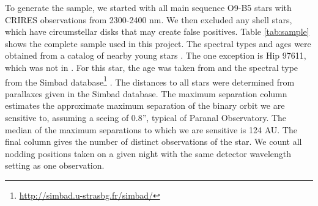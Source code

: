 \documentclass[11pt]{report}     %
\begin{document}
To generate the sample, we started with all main sequence O9-B5 stars 
with CRIRES observations from 2300-2400 nm. We then excluded any shell stars, which have circumstellar disks \citep{Porter2003} that may create
false positives. Table \ref{tab:sample} shows the complete sample used in this
project. The spectral types and ages were obtained from a catalog of nearby
young stars \citep{Tetzlaff2010}. The one exception is Hip 97611, which was
not in \cite{Tetzlaff2010}. For this star, the age was taken from
\cite{Westin1985} and the spectral type from the Simbad database\footnote{\url{http://simbad.u-strasbg.fr/simbad/}}
. The distances to all stars were
determined from parallaxes given in the Simbad database. The maximum
separation column estimates the approximate maximum separation of the binary
orbit we are sensitive to, assuming a seeing of 0.8'', typical of
Paranal Observatory. The median of the maximum separations to which we are sensitive is 124
AU.  The final column gives the number of distinct observations of the
star. We count all nodding positions taken on a given night with the same 
detector wavelength setting as one observation.

\end{document}
